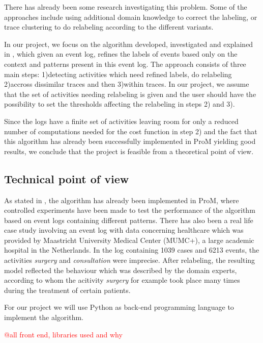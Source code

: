 \documentclass[notitlepage]{article}
\begin{document}
\begin{flushleft}
There has already been some research investigating this problem. 
Some of the approaches include using additional domain knowledge to correct the labeling, or trace clustering to do relabeling according to the different variants.

In our project, we focus on the algorithm developed, investigated and explained in \cite{Refining}, which given an event log, refines the labels of events based only on the context and patterns present in this event log.
The approach consists of three main steps: 1)detecting activities which need refined labels, do relabeling 2)accross dissimilar traces and then 3)within traces.
In our project, we assume that the set of activities needing relabeling is given and the user should have the possibility to set the thresholds affecting the relabeling in steps 2) and 3).

Since the logs have a finite set of activities leaving room for only a reduced number of computations needed for the cost function in step 2) and the fact that this algorithm has already been successfully implemented in ProM yielding good results, we conclude that the project is feasible from a theoretical point of view.\\

\subsection{Technical point of view}

As stated in \cite{Refining}, the algorithm has already been implemented in ProM, where controlled experiments have been made to test the performance of the algorithm based on event logs containing different patterns.
There has also been a real life case study involving an event log with data concerning healthcare which was provided by Maastricht University Medical Center (MUMC+), a large academic hospital in the Netherlands.
In the log containing 1039 cases and 6213 events, the activities \textit{surgery} and \textit{consultation} were imprecise.
After relabeling, the resulting model reflected the behaviour which was described by the domain experts, according to whom the acitivity \textit{surgery} for example took place many times during the treatment of certain patients.

For our project we will use Python as back-end programming language to implement the algorithm. 

\textcolor{red}{@all front end, libraries used and why}\\


\end{flushleft}
\end{document}
